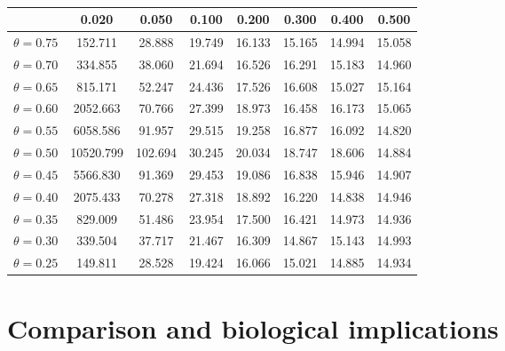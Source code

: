 \begin{table}[h!]
\begin{center}
\caption{}
\label{tab:time}
\begin{tabular}{|c|c|c|c|c|c|c|c|} \hline
 &  0.020 &  0.050 &  0.100 &  0.200 &  0.300 &  0.400 &  0.500 \\ \hline
$\theta = 0.75$ & 
 152.711 & 28.888 & 19.749 & 16.133 & 15.165 & 14.994 & 15.058 \\ \hline
$\theta = 0.70$ & 
 334.855 & 38.060 & 21.694 & 16.526 & 16.291 & 15.183 & 14.960 \\ \hline
$\theta = 0.65$ & 
 815.171 & 52.247 & 24.436 & 17.526 & 16.608 & 15.027 & 15.164 \\ \hline
$\theta = 0.60$ & 
 2052.663 & 70.766 & 27.399 & 18.973 & 16.458 & 16.173 & 15.065 \\ \hline
$\theta = 0.55$ & 
 6058.586 & 91.957 & 29.515 & 19.258 & 16.877 & 16.092 & 14.820 \\ \hline
$\theta = 0.50$ & 
 10520.799 & 102.694 & 30.245 & 20.034 & 18.747 & 18.606 & 14.884 \\ \hline
$\theta = 0.45$ & 
 5566.830 & 91.369 & 29.453 & 19.086 & 16.838 & 15.946 & 14.907 \\ \hline
$\theta = 0.40$ & 
 2075.433 & 70.278 & 27.318 & 18.892 & 16.220 & 14.838 & 14.946 \\ \hline
$\theta = 0.35$ & 
 829.009 & 51.486 & 23.954 & 17.500 & 16.421 & 14.973 & 14.936 \\ \hline
$\theta = 0.30$ & 
 339.504 & 37.717 & 21.467 & 16.309 & 14.867 & 15.143 & 14.993 \\ \hline
$\theta = 0.25$ & 
 149.811 & 28.528 & 19.424 & 16.066 & 15.021 & 14.885 & 14.934 \\ \hline
\end{tabular}
\end{center}
\end{table}

\section{ Comparison and biological implications}
\label{sec:comparison}

